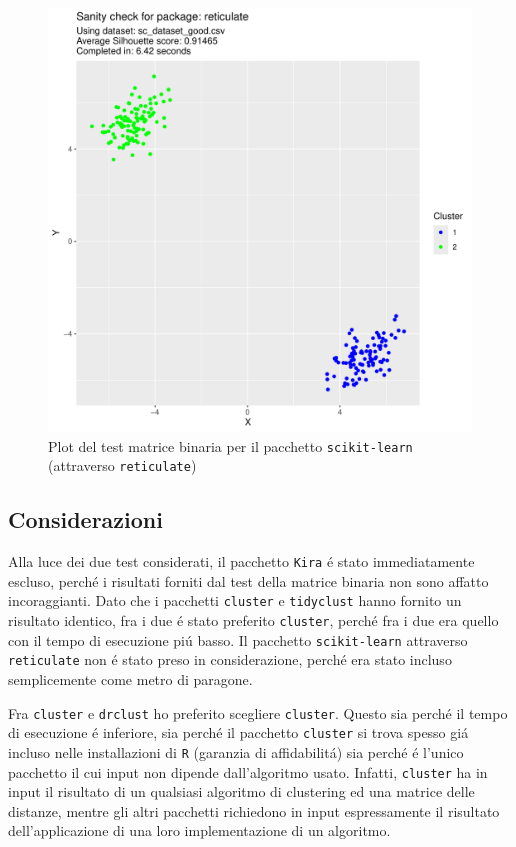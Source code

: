 \documentclass[italian]{article}
\begin{document}
			\begin{figure}[h]
				\includegraphics[width = \textwidth, page = 3]{results/results_RETICULATE.pdf}
				\caption{Plot del test matrice binaria per il pacchetto
				\texttt{scikit-learn} (attraverso \texttt{reticulate})}
				\label{fig:reticulatebm}
			\end{figure}

		\subsection{Considerazioni}

			Alla luce dei due test considerati, il pacchetto \texttt{Kira}
			é stato immediatamente escluso, perché i risultati forniti dal
			test della matrice binaria non sono affatto incoraggianti.
			Dato che i pacchetti \texttt{cluster} e \texttt{tidyclust}
			hanno fornito un risultato identico, fra i due é stato preferito
			\texttt{cluster}, perché fra i due era quello con il tempo di
			esecuzione piú basso. Il pacchetto \texttt{scikit-learn}
			attraverso \texttt{reticulate} non é stato preso in
			considerazione, perché era stato incluso semplicemente
			come metro di paragone.

			Fra \texttt{cluster} e \texttt{drclust} ho preferito scegliere
			\texttt{cluster}. Questo sia perché il tempo di esecuzione é
			inferiore, sia perché il pacchetto \texttt{cluster} si trova
			spesso giá incluso nelle installazioni di \texttt{R} (garanzia
			di affidabilitá) sia perché é l'unico pacchetto il cui input
			non dipende dall'algoritmo usato. Infatti, \texttt{cluster}
			ha in input il risultato di un qualsiasi algoritmo di clustering
			ed una matrice delle distanze, mentre gli altri pacchetti
			richiedono in input espressamente il risultato dell'applicazione
			di una loro implementazione di un algoritmo.
\end{document}
